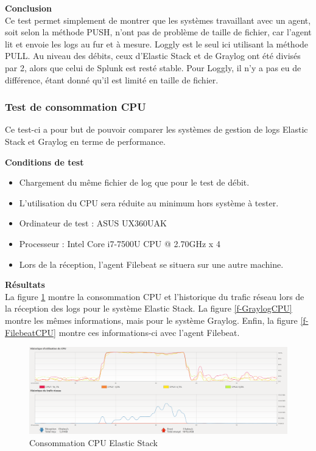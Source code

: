 \documentclass[paper=a4, fontsize=11pt]{scrartcl}
\begin{document}
\textbf{Conclusion} \\
Ce test permet simplement de montrer que les systèmes travaillant avec un agent, soit selon la méthode PUSH, n'ont pas de problème de taille de fichier, car l'agent lit et envoie les logs au fur et à mesure. Loggly est le seul ici utilisant la méthode PULL. Au niveau des débits, ceux d'Elastic Stack et de Graylog ont été divisés par 2, alors que celui de Splunk est resté stable. Pour Loggly, il n'y a pas eu de différence, étant donné qu'il est limité en taille de fichier.


\subsubsection{Test de consommation CPU}

Ce test-ci a pour but de pouvoir comparer les systèmes de gestion de logs Elastic Stack et Graylog en terme de performance.

\textbf{Conditions de test} \\
\begin{itemize}
    \item Chargement du même fichier de log que pour le test de débit.
    \item L'utilisation du CPU sera réduite au minimum hors système à tester.
    \item Ordinateur de test : ASUS UX360UAK
    \item Processeur : Intel Core i7-7500U CPU @ 2.70GHz x 4
    \item Lors de la réception, l'agent Filebeat se situera sur une autre machine.
\end{itemize}

\textbf{Résultats} \\
La figure \ref{f-ElasticCPU} montre la consommation CPU et l'historique du trafic réseau lors de la réception des logs pour le système Elastic Stack. La figure \ref{f-GraylogCPU} montre les mêmes informations, mais pour le système Graylog. Enfin, la figure \ref{f-FilebeatCPU} montre ces informations-ci avec l'agent Filebeat.

\begin{figure}[H]
    \centering
    \includegraphics[width=18cm]{img/screenshots/Elastic_CPU_MEM_Receive_modified.png}
    \caption{Consommation CPU Elastic Stack}
    \label{f-ElasticCPU}
\end{figure}
\end{document}
